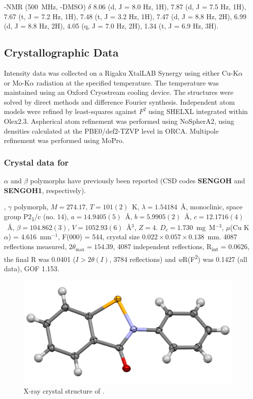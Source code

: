 \begin{refsection}
-NMR (500~MHz, -DMSO) $ \delta $ 8.06 (d, J = 8.0 Hz, 1H), 7.87 (d, J = 7.5 Hz, 1H), 7.67 (t, J = 7.2 Hz, 1H), 7.48 (t, J = 3.2 Hz, 1H), 7.47 (d, J = 8.8 Hz, 2H), 6.99 (d, J = 8.8 Hz, 2H), 4.05 (q, J = 7.0 Hz, 2H), 1.34 (t, J = 6.9 Hz, 3H).


\subsection{Crystallographic Data}
Intensity data was collected on a Rigaku XtalLAB Synergy using either Cu-K$\alpha$ or Mo-K$\alpha$ radiation at the specified temperature. 
The temperature was maintained using an Oxford Cryostream cooling device. 
The structures were solved by direct methods and difference Fourier synthesis.\autocite{Sheldrick2015}
Independent atom models were refined by least-squares against $F^{2}$ using SHELXL integrated within Olex2.3.\autocite{Sheldrick2008,Dolomanov2009}
Aspherical atom refinement was performed using NoSpherA2, using densities calculated at the PBE0/def2-TZVP level in ORCA.\autocite{Kleemiss2021,Neese2012}
Multipole refinement was performed using MoPro.\autocite{Jelsch2005}

\subsubsection{Crystal data for \texorpdfstring{}{C13 H9 N O Se}}
$\alpha$ and $\beta$ polymorphs have previously been reported (CSD codes \textbf{SENGOH} and \textbf{SENGOH1}, respectively).\autocite{Dupont1990StructuresII}

, $\gamma$ polymorph, $M=274.17$, $T=101(2)$~K, $\lambda=1.54184$~\AA, monoclinic, space group P2\textsubscript{1}/c (no. 14), $a = 14.9405(5)$~\AA, $b = 5.9905(2)$~\AA, $c = 12.1716(4)$~\AA, $\beta = 104.862(3)$\degree, $V = 1052.93(6)$~\AA$^{3}$, $Z = 4$. $D_{c}= 1.730$~mg~M$^{-3}$, $\mu$(Cu K$\alpha$) = 4.616~mm$^{-1}$, F(000) = 544, crystal size $0.022 \times 0.057 \times 0.138$~mm. 4087 reflections measured, $2\theta_{\max}=154.39$\degree, 4087 independent reflections, R\textsubscript{int} = 0.0626, the final R was 0.0401 ($I > 2\theta(I)$, 3784 reflections) and \textit{w}R(F\textsuperscript{2}) was 0.1427 (all data), GOF 1.153.

\begin{figure}
  \includegraphics[width=0.6\linewidth]{Figures/ebs-xtal.pdf}
  \caption{X-ray crystal structure of \texorpdfstring{}{C13 H9 N O Se}.}
\end{figure}


\end{refsection}
